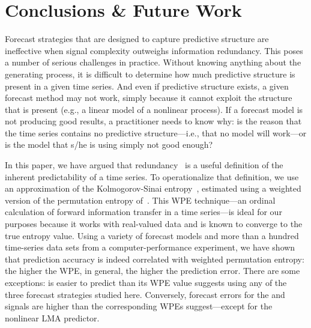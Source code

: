 \section{ Conclusions \& Future Work }\label{sec:conc}

Forecast strategies that are designed to capture predictive structure
are ineffective when signal complexity outweighs information
redundancy.  This poses a number of serious challenges in practice.
Without knowing anything about the generating process, it is difficult
to determine how much predictive structure is present in a given time
series.  And even if predictive structure exists, a given forecast
method may not work, simply because it cannot exploit the structure
that is present (e.g., a linear model of a nonlinear process).  If a
forecast model is not producing good results, a practitioner needs to
know why: is the reason that the time series contains no predictive
structure---i.e., that no model will work---or is the model that s/he
is using simply not good enough?

In this paper, we have argued that redundancy~\cite{crutchfield2003}
is a useful definition of the inherent predictability of a time
series.  To operationalize that definition, we use an approximation of
the Kolmogorov-Sinai entropy~\cite{lind95}, estimated using a weighted
version of the permutation entropy of~\cite{bandt2002per}.  This WPE
technique---an ordinal calculation of forward information transfer in
a time series---is ideal for our purposes because it works with
real-valued data and is known to converge to the true entropy value.
Using a variety of forecast models and more than a hundred time-series
data sets from a computer-performance experiment, we have shown that
prediction accuracy is indeed correlated with weighted permutation
entropy: the higher the WPE, in general, the higher the prediction
error.  There are some exceptions: \svdone is easier to predict than
its WPE value suggests using any of the three forecast strategies
studied here.  Conversely, forecast errors for the \col and \svdfive
signals are higher than the corresponding WPEs suggest---except for
the nonlinear LMA predictor.


